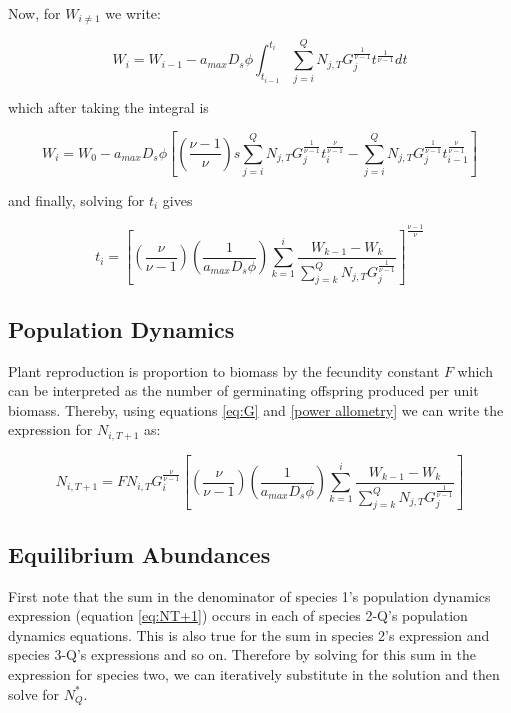\documentclass{article}
\begin{document}
  Now, for $W_{i \neq 1}$ we write:

  $$ W_{i} =  W_{i-1} - a_{max}D_{s}\phi \int_{t_{i-1}}^{t_{i}} \! \sum_{j = i}^{Q}N_{j, T}G_{j}^{\frac{1}{\nu-1}}t^{\frac{1}{\nu-1}}dt$$

  which after taking the integral is

  $$ W_{i} =  W_{0} - a_{max}D_{s}\phi \left[ (\frac{\nu - 1}{\nu}) s\sum_{j = i}^{Q}N_{j, T}G_{j}^{\frac{1}{\nu-1}}t_{i}^{\frac{\nu}{\nu-1}}  -  \sum_{j = i}^{Q}N_{j, T}G_{j}^{\frac{1}{\nu-1}}t_{i-1}^{\frac{\nu}{\nu-1}}\right] $$

  and finally, solving for $t_{i}$ gives

  \begin{equation} \label{eq:ti}
    t_{i} = \left[ (\frac{\nu}{\nu-1}) (\frac{1}{a_{max}D_{s}\phi}) \sum_{k = 1}^{i}\frac{W_{k -1} - W_{k}}{\sum_{j=k}^{Q}N_{j, T}G_{j}^{\frac{1}{\nu - 1}}} \right]^{\frac{\nu - 1}{\nu}}
  \end{equation}

  \subsection{Population Dynamics}

  Plant reproduction is proportion to biomass by the fecundity constant $F$
  which can be interpreted as the number of germinating offspring produced per
  unit biomass. Thereby, using equations \ref{eq:G} and \ref{power allometry}
  we can write the expression for $N_{i, T+1}$ as:

  \begin{equation} \label{eq:NT+1}
    N_{i, T+1} = F N_{i, T} G_{i}^{\frac{\nu}{\nu - 1}}\left[ (\frac{\nu}{\nu-1})(\frac{1}{a_{max}D_{s}\phi}) \sum_{k = 1}^{i}\frac{W_{k -1} - W_{k}}{\sum_{j=k}^{Q}N_{j, T}G_{j}^{\frac{1}{\nu - 1}}} \right]
  \end{equation}

  \subsection{Equilibrium Abundances}

  First note that the sum in the denominator of species 1's population dynamics
  expression (equation \ref{eq:NT+1}) occurs in each of species 2-Q's population
  dynamics equations. This is also true for the sum in species 2's expression
  and species 3-Q's expressions and so on. Therefore by solving for this sum in
  the expression for species two, we can iteratively substitute in the solution
  and then solve for $N_{Q}^{*}$.
\end{document}
